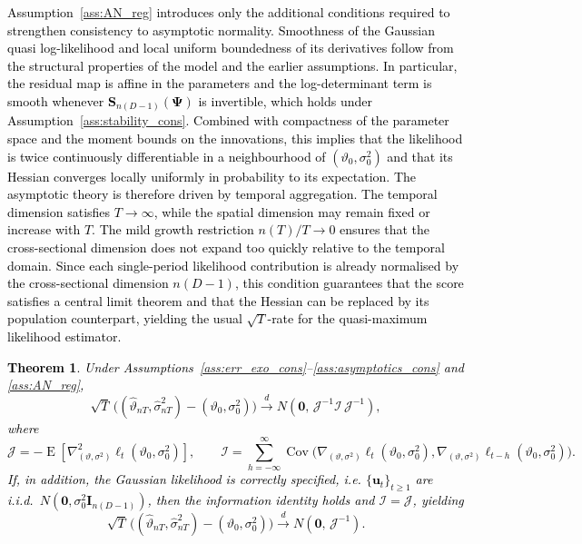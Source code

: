 \documentclass[12pt]{article}
\theoremstyle{plain}
\newtheorem{theorem}{Theorem}[section]
\theoremstyle{definition}
\newcommand{\xvec}{\boldsymbol}
\newcommand{\xmat}{\mathbf}
\DeclareMathOperator{\E}{E}
\DeclareMathOperator{\Cov}{Cov}
\begin{document}
\textcolor{black}{
Assumption~\ref{ass:AN_reg} introduces only the additional conditions required to strengthen consistency to asymptotic normality. Smoothness of the Gaussian quasi log-likelihood and local uniform boundedness of its derivatives follow from the structural properties of the model and the earlier assumptions. In particular, the residual map is affine in the parameters and the log-determinant term is smooth whenever $\xmat{S}_{n(D-1)}(\xmat{\Psi})$ is invertible, which holds under Assumption~\ref{ass:stability_cons}. Combined with compactness of the parameter space and the moment bounds on the innovations, this implies that the likelihood is twice continuously differentiable in a neighbourhood of $(\vartheta_0,\sigma_0^2)$ and that its Hessian converges locally uniformly in probability to its expectation.
%
The asymptotic theory is therefore driven by temporal aggregation. The temporal dimension satisfies $T\to\infty$, while the spatial dimension may remain fixed or increase with $T$. The mild growth restriction $n(T)/T\to0$ ensures that the cross-sectional dimension does not expand too quickly relative to the temporal domain. Since each single-period likelihood contribution is already normalised by the cross-sectional dimension $n(D-1)$, this condition guarantees that the score satisfies a central limit theorem and that the Hessian can be replaced by its population counterpart, yielding the usual $\sqrt{T}$-rate for the quasi-maximum likelihood estimator.
}


\textcolor{black}{
\begin{theorem}\label{thm:AN}
Under Assumptions~\ref{ass:err_exo_cons}--\ref{ass:asymptotics_cons}
and \ref{ass:AN_reg},
\[
\sqrt{T}\,\big((\hat\vartheta_{nT},\hat\sigma^2_{nT})-(\vartheta_0,\sigma_0^2)\big)
\xrightarrow{d}
N\!\left(\xvec{0},\,\mathcal{J}^{-1}\mathcal{I}\,\mathcal{J}^{-1}\right),
\]
where
\[
\mathcal{J}
=
-\E\!\left[\nabla^2_{(\vartheta,\sigma^2)}\ell_t(\vartheta_0,\sigma_0^2)\right],
\qquad
\mathcal{I}
=
\sum_{h=-\infty}^{\infty}\Cov\!\big(
\nabla_{(\vartheta,\sigma^2)}\ell_t(\vartheta_0,\sigma_0^2),
\nabla_{(\vartheta,\sigma^2)}\ell_{t-h}(\vartheta_0,\sigma_0^2)
\big).
\]
% 
If, in addition, the Gaussian likelihood is correctly specified, i.e.
$\{\xvec{u}_t\}_{t\ge1}$ are i.i.d.\ $N(\xvec{0},\sigma_0^2\xmat{I}_{n(D-1)})$,
then the information identity holds and $\mathcal{I}=\mathcal{J}$, yielding
\[
\sqrt{T}\,\big((\hat\vartheta_{nT},\hat\sigma^2_{nT})-(\vartheta_0,\sigma_0^2)\big)
\xrightarrow{d}
N\!\left(\xvec{0},\,\mathcal{J}^{-1}\right).
\]
\end{theorem}
}
\end{document}
